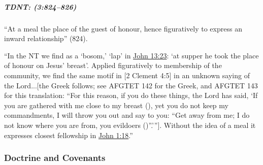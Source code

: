 			\subparagraph{TDNT: \texorpdfstring{}{}  (3:824--826)}
				\label{KOLPOS-TDNT}
				
				``At a meal the place of the guest of honour, hence figuratively to express an inward relationship'' (824).
				
				``In the NT we find  as a `bosom,' `lap' in \hyperref[JOHN-13-23]{John 13:23}: `at supper he took the place of honour on Jesus' breast'. Applied figuratively to membership of the community, we find the same motif in [2 Clement 4:5] in an unknown saying of the Lord...[the Greek follows; see AFGTET 142 for the Greek, and AFGTET 143 for this translation: ``For this reason, if you do these things, the Lord has said, `If you are gathered with me close to my breast (), yet you do not keep my commandments, I will throw you out and say to you: ``Get away from me; I do not know where you are from, you evildoers ()''.''']. Without the idea of a meal it expresses closest fellowship in \hyperref[JOHN-1-18]{John 1:18}.''
		
	
		
		
	\subsubsection{Doctrine and Covenants} %
		\label{BOSOM-DC}
	
		
		\begin{compactdesc}
			\item[{\hyperref[DC109-4]{DC 109:4}}]
		\end{compactdesc}
		
	
